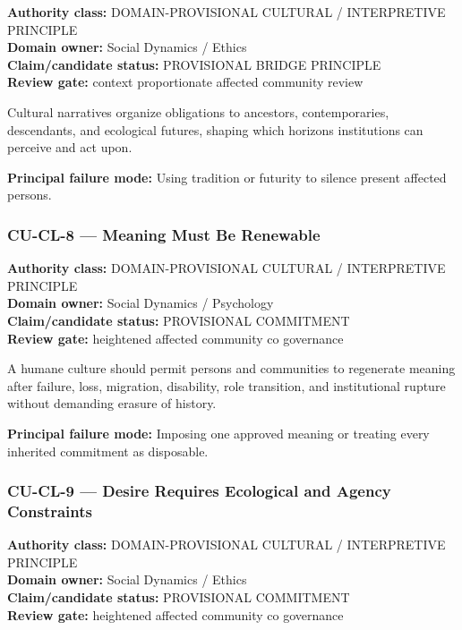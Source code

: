 \documentclass[
  11pt,
]{article}
\begin{document}
\textbf{Authority class:} DOMAIN-PROVISIONAL CULTURAL / INTERPRETIVE
PRINCIPLE\\
\textbf{Domain owner:} Social Dynamics / Ethics\\
\textbf{Claim/candidate status:} PROVISIONAL BRIDGE PRINCIPLE\\
\textbf{Review gate:} context proportionate affected community review

Cultural narratives organize obligations to ancestors, contemporaries,
descendants, and ecological futures, shaping which horizons institutions
can perceive and act upon.

\textbf{Principal failure mode:} Using tradition or futurity to silence
present affected persons.

\subsubsection{CU-CL-8 --- Meaning Must Be
Renewable}\label{cu-cl-8-meaning-must-be-renewable}

\textbf{Authority class:} DOMAIN-PROVISIONAL CULTURAL / INTERPRETIVE
PRINCIPLE\\
\textbf{Domain owner:} Social Dynamics / Psychology\\
\textbf{Claim/candidate status:} PROVISIONAL COMMITMENT\\
\textbf{Review gate:} heightened affected community co governance

A humane culture should permit persons and communities to regenerate
meaning after failure, loss, migration, disability, role transition, and
institutional rupture without demanding erasure of history.

\textbf{Principal failure mode:} Imposing one approved meaning or
treating every inherited commitment as disposable.

\subsubsection{CU-CL-9 --- Desire Requires Ecological and Agency
Constraints}\label{cu-cl-9-desire-requires-ecological-and-agency-constraints}

\textbf{Authority class:} DOMAIN-PROVISIONAL CULTURAL / INTERPRETIVE
PRINCIPLE\\
\textbf{Domain owner:} Social Dynamics / Ethics\\
\textbf{Claim/candidate status:} PROVISIONAL COMMITMENT\\
\textbf{Review gate:} heightened affected community co governance
\end{document}

